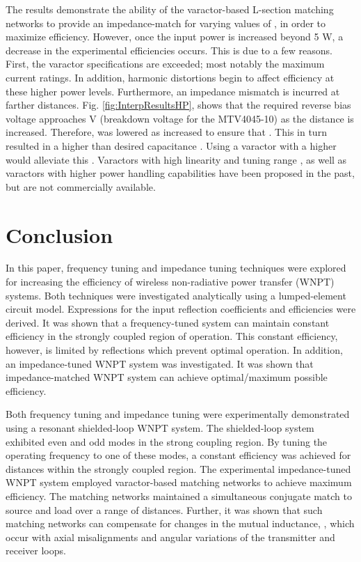 \documentclass[journal]{IEEEtran}
\begin{document}
The results demonstrate the ability of the varactor-based L-section matching networks to provide an impedance-match for varying values of , in order to maximize efficiency. However, once the input power is increased beyond 5 W, a decrease in the experimental efficiencies occurs. This is due to a few reasons. First, the varactor specifications are exceeded; most notably the maximum current ratings. In addition, harmonic distortions begin to affect efficiency at these higher power levels. Furthermore, an impedance mismatch is incurred at farther distances. Fig. \ref{fig:InterpResultsHP}, shows that the required reverse bias voltage  approaches  V (breakdown voltage for the MTV4045-10) as the distance is increased. Therefore,  was lowered as  increased to ensure that  \cite{VaracAmps}. This in turn resulted in a higher than desired capacitance . Using a varactor with a higher  would alleviate this \cite{Components2}. Varactors with high linearity and tuning range \cite{SiG1}, as well as varactors with higher power handling capabilities \cite{SiC} have been proposed in the past, but are not commercially available.

\section{Conclusion}

In this paper, frequency tuning and impedance tuning techniques were explored for increasing the efficiency of wireless non-radiative power transfer (WNPT) systems. Both techniques were investigated analytically using a lumped-element circuit model. Expressions for the input reflection coefficients and efficiencies were derived. It was shown that a frequency-tuned system can maintain constant efficiency in the strongly coupled region of operation. This constant efficiency, however, is limited by reflections which prevent optimal operation. In addition, an impedance-tuned WNPT system was investigated. It was shown that impedance-matched WNPT system can achieve optimal/maximum possible efficiency.

Both frequency tuning and impedance tuning were experimentally demonstrated using a resonant shielded-loop WNPT system. The shielded-loop system exhibited even and odd modes in the strong coupling region. By tuning the operating frequency to one of these modes, a constant efficiency was achieved for distances within the strongly coupled region.  The experimental impedance-tuned WNPT system employed varactor-based matching networks to achieve maximum efficiency. The matching networks maintained a simultaneous conjugate match to source and load over a range of distances. Further, it was shown that such matching networks can compensate for changes in the mutual inductance, , which occur with axial misalignments and angular variations of the transmitter and receiver loops.
\end{document}

